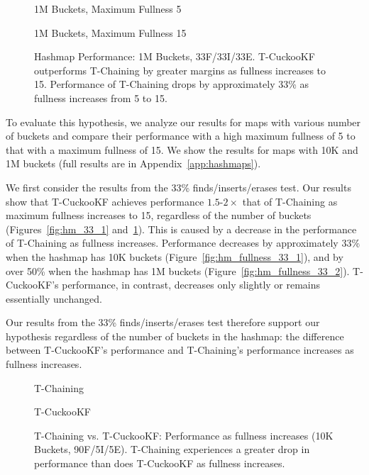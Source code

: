\begin{figure}[H]
    \centering
    \begin{minipage}{0.75\textwidth}
    \caption*{1M Buckets, Maximum Fullness 5}
        \vspace{12pt}
    \end{minipage}
   \begin{minipage}{0.75\textwidth}
    \caption*{1M Buckets, Maximum Fullness 15}
        \vspace{12pt}
    \end{minipage}
	\caption[Hashmap Performance: 1M Buckets, 33F/33I/33E]{Hashmap Performance: 1M Buckets, 33F/33I/33E. T-CuckooKF outperforms T-Chaining by greater margins as fullness increases to 15. Performance of T-Chaining drops by approximately 33\% as fullness increases from 5 to 15.}
    \label{fig:hm_33_3}
\end{figure}

To evaluate this hypothesis, we analyze our results for maps with various number of buckets and compare their performance with a high maximum fullness of 5 to that with a maximum fullness of 15. We show the results for maps with 10K and 1M buckets (full results are in Appendix~\ref{app:hashmaps}).

We first consider the results from the 33\% finds/inserts/erases test. Our results show that T-CuckooKF achieves performance $1.5$-$2\times$ that of T-Chaining as maximum fullness increases to 15, regardless of the number of buckets (Figures~\ref{fig:hm_33_1} and~\ref{fig:hm_33_3}). 
This is caused by a decrease in the performance of T-Chaining as fullness increases. Performance decreases by approximately 33\% when the hashmap has 10K buckets (Figure~\ref{fig:hm_fullness_33_1}), and by over 50\% when the hashmap has 1M buckets (Figure~\ref{fig:hm_fullness_33_2}). T-CuckooKF's performance, in contrast, decreases only slightly or remains essentially unchanged.

Our results from the 33\% finds/inserts/erases test therefore support our hypothesis regardless of the number of buckets in the hashmap: the difference between T-CuckooKF's performance and T-Chaining's performance increases as fullness increases. 

\begin{figure}[H]
    \centering
    \begin{minipage}{0.7\textwidth}
    \caption*{T-Chaining}
        \vspace{12pt}
    \end{minipage}
    \begin{minipage}{0.7\textwidth}
    \caption*{T-CuckooKF}
    \end{minipage}
    \caption[T-Chaining vs. T-CuckooKF: Performance as fullness increases (10K Buckets, 90F/5I/5E)]{T-Chaining vs. T-CuckooKF: Performance as fullness increases (10K Buckets, 90F/5I/5E). T-Chaining experiences a greater drop in performance than does T-CuckooKF as fullness increases.}
    \label{fig:hm_fullness_90_1}
\end{figure}

